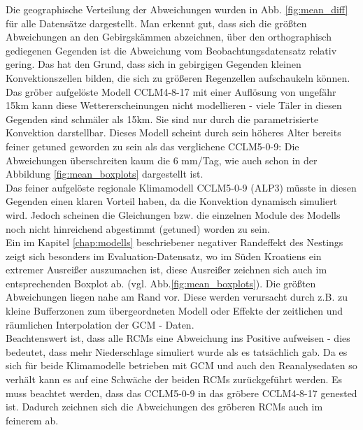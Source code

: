 Die geographische Verteilung der Abweichungen wurden in Abb. \ref{fig:mean_diff} für alle Datensätze dargestellt. Man erkennt gut, dass sich die größten Abweichungen an den Gebirgskämmen abzeichnen, über den orthographisch gediegenen Gegenden ist die Abweichung vom Beobachtungsdatensatz relativ gering. Das hat den Grund, dass sich in gebirgigen Gegenden  kleinen Konvektionszellen bilden, die sich zu größeren Regenzellen aufschaukeln können. Das gröber aufgelöste Modell CCLM4-8-17 mit einer Auflösung von ungefähr 15km kann diese Wettererscheinungen nicht modellieren - viele Täler in diesen Gegenden sind schmäler als 15km. Sie sind nur durch die parametrisierte Konvektion darstellbar. Dieses Modell scheint durch sein höheres Alter bereits feiner getuned geworden zu sein als das verglichene CCLM5-0-9: Die Abweichungen überschreiten kaum die 6 mm/Tag, wie auch schon in der Abbildung \ref{fig:mean_boxplots} dargestellt ist.\\
Das feiner aufgelöste regionale Klimamodell CCLM5-0-9 (ALP3) müsste in diesen Gegenden einen klaren Vorteil haben, da die Konvektion dynamisch simuliert wird. Jedoch scheinen die Gleichungen bzw. die einzelnen Module des Modells noch nicht hinreichend abgestimmt (getuned) worden zu sein.\\
Ein im Kapitel \ref{chap:modells} beschriebener negativer Randeffekt des Nestings zeigt sich besonders im Evaluation-Datensatz, wo im Süden Kroatiens ein extremer Ausreißer auszumachen ist, diese Ausreißer zeichnen sich auch im entsprechenden Boxplot ab. (vgl. Abb.\ref{fig:mean_boxplots}). Die größten Abweichungen liegen nahe am Rand vor. Diese werden verursacht durch z.B. zu kleine Bufferzonen zum übergeordneten Modell oder Effekte der zeitlichen und räumlichen Interpolation der GCM - Daten.\\
Beachtenswert ist, dass alle RCMs eine Abweichung ins Positive aufweisen - dies bedeutet, dass mehr Niederschlage simuliert wurde als es tatsächlich gab. Da es sich für beide Klimamodelle betrieben mit GCM und auch den Reanalysedaten so verhält kann es auf eine Schwäche der beiden RCMs zurückgeführt werden. Es muss beachtet werden, dass das CCLM5-0-9 in das gröbere CCLM4-8-17 genested ist. Dadurch zeichnen sich die Abweichungen des gröberen RCMs auch im feinerem ab.

